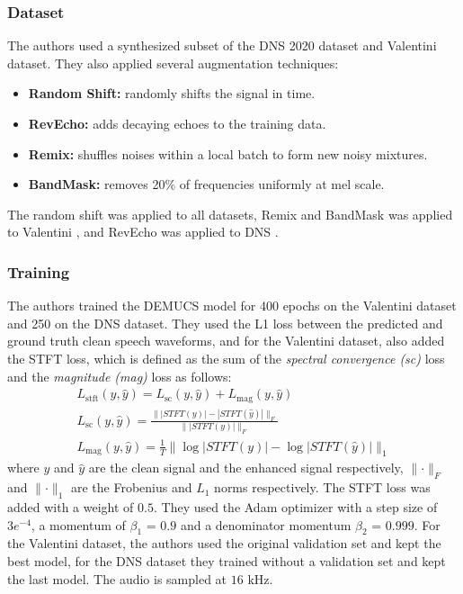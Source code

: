\subsubsection{Dataset}
The authors used a synthesized subset of the DNS 2020 dataset \cite{reddy2020} and Valentini \cite{valentini2016} dataset. They also applied several augmentation techniques:
\begin{itemize}
    \item \textbf{Random Shift:} randomly shifts the signal in time.
    \item \textbf{RevEcho:} adds decaying echoes to the training data.
    \item \textbf{Remix:} shuffles noises within a local batch to form new noisy mixtures.
    \item \textbf{BandMask:} removes 20\% of frequencies uniformly at mel scale.
\end{itemize}
The random shift was applied to all datasets, Remix and BandMask was applied to Valentini \cite{valentini2016}, and RevEcho was applied to DNS \cite{reddy2020}.

\subsubsection{Training}
The authors trained the DEMUCS model for 400 epochs on the Valentini \cite{valentini2016} dataset and 250 on the DNS \cite{reddy2020} dataset. They used the L1 loss between the predicted and ground truth clean speech waveforms, and for the Valentini dataset, also added the STFT loss, which is defined as the sum of the \textit{spectral convergence (sc)} loss and the \textit{magnitude (mag)} loss as follows:
\begin{equation}
    \begin{split}
        L_{\text{stft}}(y,\hat{y}) = L_{\text{sc}}(y,\hat{y}) + L_{\text{mag}}(y,\hat{y})                              \\
        L_{\text{sc}}(y,\hat{y}) = \frac{\lVert |STFT(y)| - |STFT(\hat{y})| \rVert _{F}}{\lVert |STFT(y)| \rVert _{F}} \\
        L_{\text{mag}}(y,\hat{y}) = \frac{1}{T} \lVert \log{|STFT(y)|} - \log{|STFT(\hat{y})|} \rVert _{1}
    \end{split}
\end{equation}
where $y$ and $\hat{y}$ are the clean signal and the enhanced signal respectively, $\lVert \cdot \rVert _F$ and $\lVert \cdot \rVert _1$ are the Frobenius and $L_1$ norms respectively. The STFT loss was added with a weight of $0.5$. They used the Adam optimizer with a step size of $3e^{-4}$, a momentum of $\beta_1$ = $0.9$ and a denominator momentum $\beta_2$ = $0.999$. For the Valentini dataset, the authors used the original validation set and kept the best model, for the DNS dataset they trained without a validation set and kept the last model. The audio is sampled at $16$ kHz.

